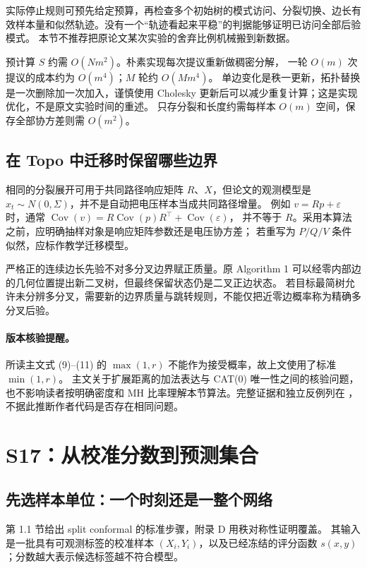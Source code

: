 \documentclass[UTF8,11pt,fontset=fandol,openany,oneside]{ctexbook}
\theoremstyle{definition}
\theoremstyle{remark}
\numberwithin{equation}{chapter}
\begin{document}
实际停止规则可预先给定预算，再检查多个初始树的模式访问、分裂切换、边长有效样本量和似然轨迹。没有一个“轨迹看起来平稳”的判据能够证明已访问全部后验模式。
本节不推荐把原论文某次实验的舍弃比例机械搬到新数据。

预计算 $S$ 约需 $O(Nm^2)$。朴素实现每次提议重新做稠密分解，
一轮 $O(m)$ 次提议的成本约为 $O(m^4)$；$M$ 轮约 $O(Mm^4)$。
单边变化是秩一更新，拓扑替换是一次删除加一次加入，谨慎使用 Cholesky 更新后可以减少重复计算；这是实现优化，不是原文实验时间的重述。
只存分裂和长度约需每样本 $O(m)$ 空间，保存全部协方差则需 $O(m^2)$。

\subsection{在 Topo 中迁移时保留哪些边界}

相同的分裂展开可用于共同路径响应矩阵 $R$、$X$，但论文的观测模型是
$x_t\sim N(0,\Sigma)$，并不是自动把电压样本当成共同路径增量。
例如 $v=Rp+\varepsilon$ 时，通常
$\operatorname{Cov}(v)=R\operatorname{Cov}(p)R^\top+\operatorname{Cov}(\varepsilon)$，
并不等于 $R$。采用本算法之前，应明确抽样对象是响应矩阵参数还是电压协方差；
若重写为 $P/Q/V$ 条件似然，应标作教学迁移模型。

严格正的连续边长先验不对多分叉边界赋正质量。原 Algorithm 1 可以经零内部边的几何位置提出新二叉树，但最终保留状态仍是二叉正边状态。
若目标最简树允许未分辨多分叉，需要新的边界质量与跳转规则，不能仅把近零边概率称为精确多分叉后验。

\paragraph{版本核验提醒。}
所读主文式 (9)--(11) 的 $\max(1,r)$ 不能作为接受概率，故上文使用了标准 $\min(1,r)$。
主文关于扩展距离的加法表达与 CAT(0) 唯一性之间的核验问题，也不影响读者按明确密度和 MH 比率理解本节算法。完整证据和独立反例列在 ，不据此推断作者代码是否存在相同问题。

\section{S17：从校准分数到预测集合}
\label{sec:textbook-S17}

\subsection{先选样本单位：一个时刻还是一整个网络}

\citet{S17} 第 1.1 节给出 split conformal 的标准步骤，附录 D 用秩对称性证明覆盖。
其输入是一批具有可观测标签的校准样本 $(X_i,Y_i)$，以及已经冻结的评分函数
$s(x,y)$；分数越大表示候选标签越不符合模型。
\end{document}
